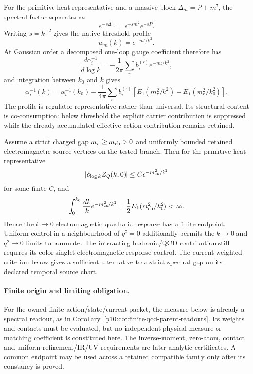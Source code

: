 \documentclass[12pt,a4paper]{article}
\begin{document}
\begin{proposition}
\label{p12:prop:v2141-heat-threshold-coconsumption}
For the primitive heat representative and a massive block
$\Delta_m=P+m^2$, the spectral factor separates as
\[
 e^{-s\Delta_m}=e^{-sm^2}e^{-sP}.
\]
Writing $s=k^{-2}$ gives the native threshold profile
\begin{equation}
\label{p12:eq:v2141-threshold-profile}
 \boxed{w_m(k)=e^{-m^2/k^2}.}
\end{equation}
At Gaussian order a decomposed one-loop gauge coefficient therefore has
\[
 \frac{d\alpha_i^{-1}}{d\log k}
 =-\frac1{2\pi}\sum_r b_i^{(r)}e^{-m_r^2/k^2},
\]
and integration between $k_0$ and $k$ gives
\begin{equation}
\label{p12:eq:v2141-threshold-E1}
 \boxed{
 \alpha_i^{-1}(k)=\alpha_i^{-1}(k_0)
 -\frac1{4\pi}\sum_r b_i^{(r)}
 \left[E_1(m_r^2/k^2)-E_1(m_r^2/k_0^2)\right].}
\end{equation}
The profile is regulator-representative rather than universal.  Its structural
content is co-consumption: below threshold the explicit carrier contribution
is suppressed while the already accumulated effective-action contribution
remains retained.
\end{proposition}

\begin{corollary}
\label{p12:cor:v2141-charged-gap-ir}
Assume a strict charged gap $m_r\ge m_{\rm ch}>0$ and uniformly bounded
retained electromagnetic source vertices on the tested branch.  Then for the
primitive heat representative
\[
 |\partial_{\log k}Z_Q(k,0)|\le C e^{-m_{\rm ch}^2/k^2}
\]
for some finite $C$, and
\[
 \int_0^{k_0}\frac{dk}{k}e^{-m_{\rm ch}^2/k^2}
 =\frac12E_1(m_{\rm ch}^2/k_0^2)<\infty.
\]
Hence the $k\to0$ electromagnetic quadratic response has a finite endpoint.
Uniform control in a neighbourhood of $q^2=0$ additionally permits the
$k\to0$ and $q^2\to0$ limits to commute.  The interacting hadronic/QCD
contribution still requires its color-singlet electromagnetic response
control.  The current-weighted criterion below gives a sufficient alternative
to a strict spectral gap on its declared temporal source chart.
\end{corollary}


\paragraph{Finite origin and limiting obligation.}
For the owned finite action/state/current packet, the measure below is already
a spectral readout, as in
Corollary~\ref{p10:cor:finite-qcd-parent-readouts}.
Its weights and contacts must be evaluated, but no independent physical
measure or matching coefficient is constituted here.
The inverse-moment, zero-atom, contact and uniform refinement/IR/UV
requirements are later analytic certificates.  A common endpoint may be used
across a retained compatible family only after its constancy is proved.
\end{document}

